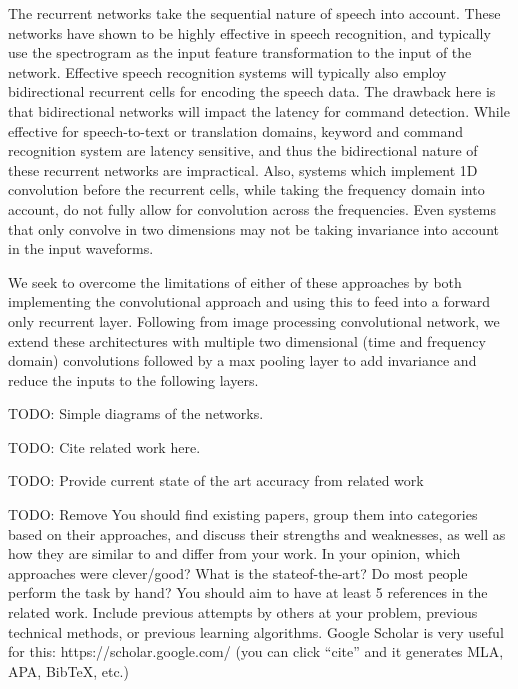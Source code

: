 \documentclass{article}
\begin{document}
The recurrent networks take the sequential nature of speech into
account. These networks have shown to be highly effective in speech
recognition, and typically use the spectrogram as the input feature
transformation to the input of the network. Effective speech
recognition systems will typically also employ bidirectional recurrent
cells for encoding the speech data. The drawback here is that
bidirectional networks will impact the latency for command
detection. While effective for speech-to-text or translation domains,
keyword and command recognition system are latency sensitive, and thus
the bidirectional nature of these recurrent networks are
impractical. Also, systems which implement 1D convolution before the
recurrent cells, while taking the frequency domain into account, do
not fully allow for convolution across the frequencies. Even systems
that only convolve in two dimensions may not be taking invariance into
account in the input waveforms.

We seek to overcome the limitations of either of these approaches by
both implementing the convolutional approach and using this to feed
into a forward only recurrent layer. Following from image processing
convolutional network, we extend these architectures with multiple two
dimensional (time and frequency domain) convolutions followed by a max
pooling layer to add invariance and reduce the inputs to the following
layers.

TODO: Simple diagrams of the networks.

TODO: Cite related work here.

TODO: Provide current state of the art accuracy from related work

TODO: Remove
You should find existing papers, group them into categories based on their approaches,
and discuss their strengths and weaknesses, as well as how they are similar to and differ
from your work. In your opinion, which approaches were clever/good? What is the stateof-the-art?
Do most people perform the task by hand? You should aim to have at least
5 references in the related work. Include previous attempts by others at your problem,
previous technical methods, or previous learning algorithms. Google Scholar is very useful
for this: https://scholar.google.com/ (you can click “cite” and it generates MLA, APA,
BibTeX, etc.)
\end{document}
